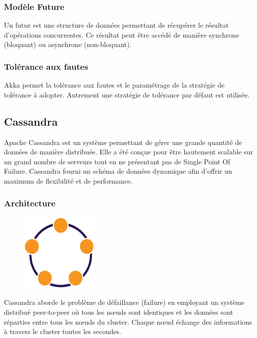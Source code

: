 \documentclass[a4paper, 11pt, titlepage]{article}
\begin{document}
\subsubsection {Modèle Future}

Un futur est une structure de données permettant de récupérer le résultat d'opérations concurrentes.
Ce résultat peut être accédé de manière synchrone (bloquant) ou asynchrone (non-bloquant).



\subsubsection* {Tolérance aux fautes}

Akka permet la tolérance aux fautes et le paramétrage de la stratégie de tolérance à adopter. Autrement une stratégie de tolérance par défaut est utilisée.



\newpage
\subsection {Cassandra}

Apache Cassandra est un système permettant de gérer une grande quantité de données de manière distribuée. Elle a été conçue pour être hautement scalable sur un grand nombre de serveurs tout en ne présentant pas de Single Point Of Failure.
Cassandra fourni un schéma de données dynamique afin d'offrir un maximum de flexibilité et de performance.


\setlength{\intextsep}{0pt}

\subsubsection* {Architecture}

\begin{figure}
\includegraphics[scale=0.4]{res/archi_cass.png}
\end{figure}

Cassandra aborde le problème de défaillance (failure) en employant un système distribué peer-to-peer où tous les nœuds sont identiques et les données sont réparties entre tous les nœuds du cluster.
Chaque nœud échange des informations à travers le cluster toutes les secondes.
\end{document}
